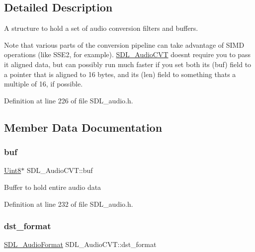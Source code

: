 \subsection{Detailed Description}
A structure to hold a set of audio conversion filters and buffers. 

Note that various parts of the conversion pipeline can take advantage of S\+I\+MD operations (like S\+S\+E2, for example). \mbox{\hyperlink{struct_s_d_l___audio_c_v_t}{S\+D\+L\+\_\+\+Audio\+C\+VT}} doesn\textquotesingle{}t require you to pass it aligned data, but can possibly run much faster if you set both its (buf) field to a pointer that is aligned to 16 bytes, and its (len) field to something that\textquotesingle{}s a multiple of 16, if possible. 

Definition at line 226 of file S\+D\+L\+\_\+audio.\+h.



\subsection{Member Data Documentation}
\mbox{\label{struct_s_d_l___audio_c_v_t_a080db27b929efa983c5161360ffce310}} 
\subsubsection{\texorpdfstring{buf}{buf}}
{\footnotesize\ttfamily \mbox{\hyperlink{_s_d_l__stdinc_8h_a2944638813a090aa23e62f4da842c3e2}{Uint8}}$\ast$ S\+D\+L\+\_\+\+Audio\+C\+V\+T\+::buf}

Buffer to hold entire audio data 

Definition at line 232 of file S\+D\+L\+\_\+audio.\+h.

\mbox{\label{struct_s_d_l___audio_c_v_t_a8f890d017be857a3b048bf00525736c6}} 
\subsubsection{\texorpdfstring{dst\_format}{dst\_format}}
{\footnotesize\ttfamily \mbox{\hyperlink{_s_d_l__audio_8h_a491ed103fd25d920c4e6b7495217ce66}{S\+D\+L\+\_\+\+Audio\+Format}} S\+D\+L\+\_\+\+Audio\+C\+V\+T\+::dst\+\_\+format}

